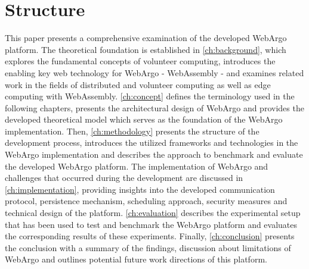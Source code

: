 \section{Structure}
\label{sec:intro:structure}
This paper presents a comprehensive examination of the developed WebArgo platform. The theoretical foundation is established in \autoref{ch:background}, which explores the fundamental concepts of volunteer computing, introduces the enabling key web technology for WebArgo - WebAssembly - and examines related work in the fields of distributed and volunteer computing as well as edge computing with WebAssembly. \autoref{ch:concept} defines the terminology used in the following chapters, presents the architectural design of WebArgo and provides the developed theoretical model which serves as the foundation of the WebArgo implementation. Then, \autoref{ch:methodology} presents the structure of the development process, introduces the utilized frameworks and technologies in the WebArgo implementation and describes the approach to benchmark and evaluate the developed WebArgo platform. The implementation of WebArgo and challenges that occurred during the development are discussed in \autoref{ch:implementation}, providing insights into the developed communication protocol, persistence mechanism, scheduling approach, security measures and technical design of the platform. \autoref{ch:evaluation} describes the experimental setup that has been used to test and benchmark the WebArgo platform and evaluates the corresponding results of these experiments. Finally, \autoref{ch:conclusion} presents the conclusion with a summary of the findings, discussion about limitations of WebArgo and outlines potential future work directions of this platform.